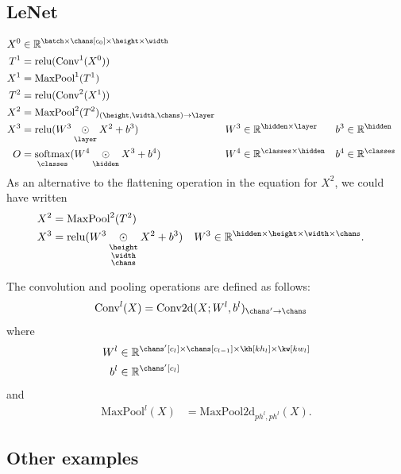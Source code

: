 \documentclass{article}
\newcommand{\reals}{\mathbb{R}}
\begin{document}
\subsection{LeNet}

\begin{align*}
X^0 &\in \reals^{\batch \times \chans[c_0] \times \height \times \width} \\
T^1 &= \text{relu}(\text{Conv}^1(X^0)) \\
X^1 &= \text{MaxPool}^1(T^1) \\
T^2 &= \text{relu}(\text{Conv}^2(X^1)) \\
X^2 &= \text{MaxPool}^2(T^2)_{(\height,\width,\chans)\rightarrow\layer} \\
X^3 &= \text{relu}(W^3 \ndot{\layer} X^2 + b^3) & W^3 &\in \mathbb{R}^{\hidden \times \layer} & b^3 &\in \mathbb{R}^{\hidden} \\
O &= \nfun{\classes}{softmax} (W^4 \ndot{\hidden} X^3 + b^4) & W^4 &\in \mathbb{R}^{\classes \times \hidden} & b^4 &\in \mathbb{R}^{\classes}
\end{align*}
As an alternative to the flattening operation in the equation for $X^2$, we could have written
\begin{align*}
X^2 &= \text{MaxPool}^2(T^2) \\
X^3 &= \text{relu}(W^3 \ndot{\height \\ \width \\ \chans} X^2 + b^3) & W^3 &\in \mathbb{R}^{\hidden \times \height \times \width \times \chans}.
\end{align*}

The convolution and pooling operations are defined as follows:
\begin{align*}
\text{Conv}^l(X) &= \text{Conv2d}(X; W^l, b^l)_{\chans'\rightarrow\chans}
\end{align*}
where
\begin{align*}
W^l & \in \reals^{\chans'[c_l] \times \chans[c_{l-1}] \times \kh[kh_l] \times \kw[kw_l]} \\
b^l &\in \reals^{\chans'[c_l]}
\end{align*}
and
\begin{align*}
\text{MaxPool}^l(X) &= \text{MaxPool2d}_{ph^l,ph^l}(X).
\end{align*}

\subsection{Other examples}
\end{document}
